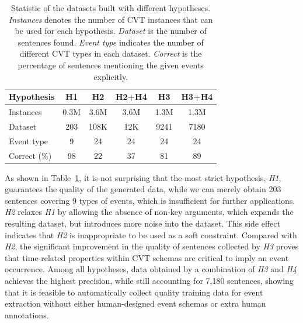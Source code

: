 \begin{table}[h]
\small
\centering
\begin{tabular}{|l|c|c|c|c|c|} \hline
	Hypothesis & H1 & H2 & H2+H4 & H3 & H3+H4 \\ \hline
	Instances & 0.3M & 3.6M & 3.6M & 1.3M & 1.3M \\ \hline
	Dataset & 203 & 108K & 12K & 9241 & 7180 \\ \hline
	Event type & 9 & 24 & 24 & 24 & 24 \\ \hline
	Correct (\%) & 98 & 22 & 37 & 81 & 89 \\ \hline
\end{tabular}
\caption{Statistic of the datasets built with different hypotheses. \textit{Instances} denotes the number of CVT instances that can be used for each hypothesis.  \textit{Dataset} is the number of sentences found.  \textit{Event type} indicates the number of different CVT types in each dataset.  \textit{Correct} is the percentage of sentences mentioning the given events explicitly. \label{tab:3}}
\end{table}

As shown in Table~\ref{tab:3}, it is not surprising that the most strict hypothesis, \emph{H1}, guarantees the quality of the generated data, while we can merely obtain 203 sentences covering 9 types of events,  which is insufficient for further applications. \emph{H2} relaxes \emph{H1} by allowing the absence of non-key arguments, which  expands the resulting dataset, but introduces more noise into the dataset. 
This side effect indicates that \emph{H2} is inappropriate to be used as a soft constraint. Compared with \emph{H2}, the significant improvement in the quality of sentences collected by \emph{H3} proves that time-related properties within CVT schemas are critical to imply an event occurrence. Among all hypotheses,  data obtained by a combination of \emph{H3} and \emph{H4} achieves the highest precision, while still accounting for 7,180 sentences, showing that it is feasible to automatically collect quality training data for event extraction without either human-designed event schemas or extra human annotations.     

